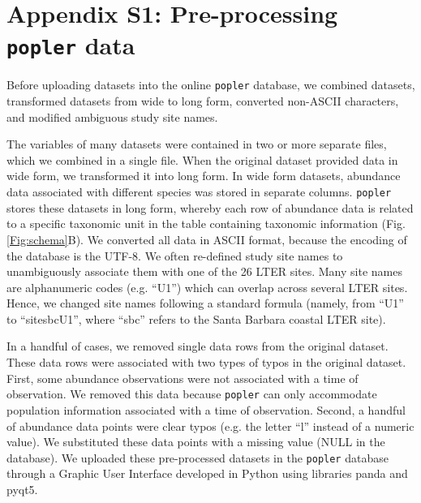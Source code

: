 \documentclass{article}\usepackage[]{graphicx}\usepackage[]{color}
\begin{document}
\newpage

\section*{Appendix S1: Pre-processing \texttt{popler} data}
Before uploading datasets into the online \texttt{popler} database, we combined datasets, transformed datasets from wide to long form, converted non-ASCII characters, and modified ambiguous study site names.


The variables of many datasets were contained in two or more separate files, which we combined in a single file. When the original dataset provided data in wide form, we transformed it into long form. In wide form datasets, abundance data associated with different species was stored in separate columns. \texttt{popler} stores these datasets in long form, whereby each row of abundance data is related to a specific taxonomic unit in the table containing taxonomic information (Fig. \ref{Fig:schema}B). We converted all data in ASCII format, because the encoding of the database is the UTF-8. We often re-defined study site names to unambiguously associate them with one of the 26 LTER sites. Many site names are alphanumeric codes (e.g. ``U1'') which can overlap across several LTER sites. Hence, we changed site names following a standard formula (namely, from ``U1'' to ``site\textunderscore sbc\textunderscore U1'', where ``sbc'' refers to the Santa Barbara coastal LTER site).

In a handful of cases, we removed single data rows from the original dataset. These data rows were associated with two types of typos in the original dataset. First, some abundance observations were not associated with a time of observation. We removed this data because \texttt{popler} can only accommodate population information associated with a time of observation. Second, a handful of abundance data points were clear typos (e.g. the letter ``l'' instead of a numeric value). We substituted these data points with a missing value (NULL in the database). We uploaded these pre-processed datasets in the \texttt{popler} database through a Graphic User Interface developed in Python using libraries panda and pyqt5.

\newpage
\setcounter{table}{0}
\renewcommand{\thetable}{S\arabic{table}}
\end{document}
